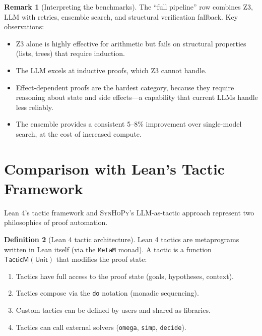 \documentclass[11pt,a4paper]{report}
\theoremstyle{definition}
\newtheorem{definition}{Definition}[chapter]
\newtheorem{remark}[definition]{Remark}
\theoremstyle{plain}
\newcommand{\synhopy}{\textsc{SynHoPy}}
\begin{document}
\begin{remark}[Interpreting the benchmarks]
The ``full pipeline'' row combines Z3, LLM with retries, ensemble search,
and structural verification fallback.  Key observations:
\begin{itemize}
  \item Z3 alone is highly effective for arithmetic but fails on structural
    properties (lists, trees) that require induction.
  \item The LLM excels at inductive proofs, which Z3 cannot handle.
  \item Effect-dependent proofs are the hardest category, because they require
    reasoning about state and side effects---a capability that current LLMs
    handle less reliably.
  \item The ensemble provides a consistent 5--8\% improvement over single-model
    search, at the cost of increased compute.
\end{itemize}
\end{remark}


\section{Comparison with Lean's Tactic Framework}

Lean 4's tactic framework and \synhopy{}'s LLM-as-tactic approach represent
two philosophies of proof automation.

\begin{definition}[Lean 4 tactic architecture]
Lean 4 tactics are metaprograms written in Lean itself (via the
\lstinline[style=fstar]|MetaM| monad).  A tactic is a function
$\mathsf{TacticM}(\mathsf{Unit})$ that modifies the proof state:
\begin{enumerate}
  \item Tactics have full access to the proof state (goals, hypotheses, context).
  \item Tactics compose via the \lstinline[style=fstar]|do| notation (monadic sequencing).
  \item Custom tactics can be defined by users and shared as libraries.
  \item Tactics can call external solvers (\lstinline[style=fstar]|omega|,
    \lstinline[style=fstar]|simp|, \lstinline[style=fstar]|decide|).
\end{enumerate}
\end{definition}
\end{document}
